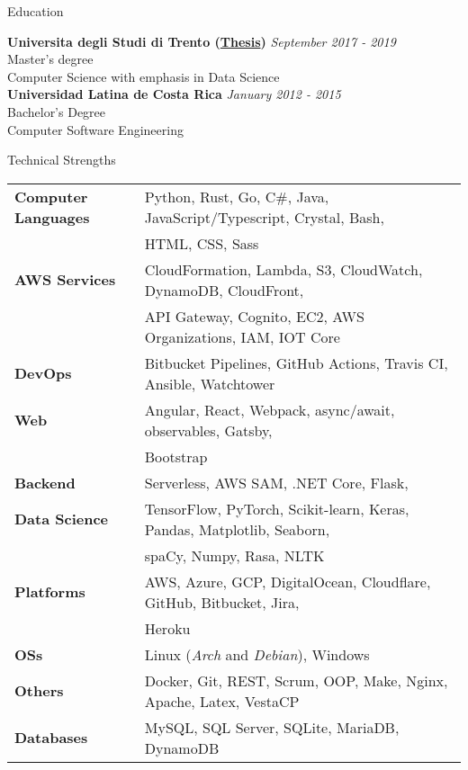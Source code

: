 \documentclass{resume} %
\begin{document}

\begin{rSection}{Education}

{\bf Universita degli Studi di Trento (\href{https://github.com/tupini07/Master-Thesis/tree/master}{Thesis})} \hfill {\em September 2017 - 2019} 
\\ Master's degree \hfill 
\\ Computer Science with emphasis in Data Science \\


{\bf Universidad Latina de Costa Rica} \hfill {\em January 2012 - 2015} 
\\ Bachelor’s Degree \hfill 
\\ Computer Software Engineering 


\end{rSection}

\begin{rSection}{Technical Strengths}

\begin{tabular}{ @{} >{\bfseries}l @{\hspace{4ex}} l }
Computer Languages & Python, Rust, Go, C\#, Java, JavaScript/Typescript, Crystal, Bash, \\
                   & HTML, CSS, Sass \\
AWS Services       & CloudFormation, Lambda, S3, CloudWatch, DynamoDB, CloudFront, \\
                   & API Gateway, Cognito, EC2, AWS Organizations, IAM, IOT Core \\
DevOps             & Bitbucket Pipelines, GitHub Actions, Travis CI, Ansible, Watchtower \\
Web                & Angular, React, Webpack, async/await, observables, Gatsby, \\
                   & Bootstrap \\
Backend            & Serverless, AWS SAM, .NET Core, Flask,  \\
Data Science       & TensorFlow, PyTorch, Scikit-learn, Keras, Pandas, Matplotlib, Seaborn, \\
                   & spaCy, Numpy, Rasa, NLTK \\
Platforms          & AWS, Azure, GCP, DigitalOcean, Cloudflare, GitHub, Bitbucket, Jira, \\
                   & Heroku \\
OSs                & Linux (\textit{Arch} and \textit{Debian}), Windows \\
Others             & Docker, Git, REST, Scrum, OOP, Make, Nginx, Apache, Latex, VestaCP \\ 
Databases          & MySQL, SQL Server, SQLite, MariaDB, DynamoDB
\end{tabular}

\end{rSection}
\end{document}
